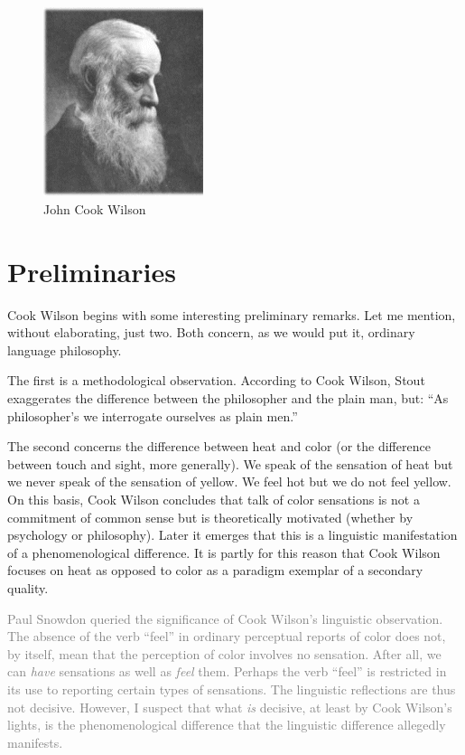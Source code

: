 \documentclass[11pt]{article}
\title{\mytitle\\
\mysubtitle}
\author{\myauthor}
\date{} %
\newcommand{\discuss}[2][gray]{\textcolor{#1}{#2}}
\begin{document}
\maketitle

\setlength{\parindent}{1em}


\begin{figure}[htbp]
	\centering
		\includegraphics[scale=1]{../graphics/wilson.jpg}
	\caption{John Cook Wilson}
	\label{fig:wilson}
\end{figure}

\section{Preliminaries} %
\label{sec:preliminaries}

Cook Wilson begins with some interesting preliminary remarks. Let me mention, without elaborating, just two. Both concern, as we would put it, ordinary language philosophy. 

The first is a methodological observation. According to Cook Wilson, Stout exaggerates the difference between the philosopher and the plain man, but: ``As philosopher's we interrogate ourselves as plain men.'' 

The second concerns the difference between heat and color (or the difference between touch and sight, more generally). We speak of the sensation of heat but we never speak of the sensation of yellow. We feel hot but we do not feel yellow. On this basis, Cook Wilson concludes that talk of color sensations is not a commitment of common sense but is theoretically motivated (whether by psychology or philosophy). Later it emerges that this is a linguistic manifestation of a phenomenological difference. It is partly for this reason that Cook Wilson focuses on heat as opposed to color as a paradigm exemplar of a secondary quality.

\discuss{Paul Snowdon queried the significance of Cook Wilson's linguistic observation. The absence of the verb ``feel'' in ordinary perceptual reports of color does not, by itself, mean that the perception of color involves no sensation. After all, we can \emph{have} sensations as well as \emph{feel} them. Perhaps the verb ``feel'' is restricted in its use to reporting certain types of sensations. The linguistic reflections are thus not decisive. However, I suspect that what \emph{is} decisive, at least by Cook Wilson's lights, is the phenomenological difference that the linguistic difference allegedly manifests.}
\end{document}
